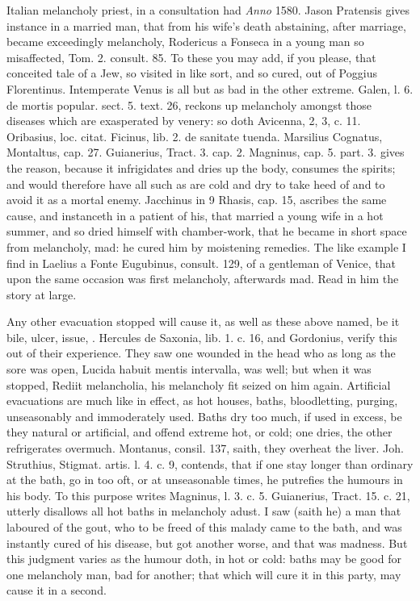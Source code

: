 {{Italian melancholy priest, in a consultation had \emph{Anno} 1580. Jason
Pratensis gives instance in a married man, that from his wife's death
abstaining, after marriage, became exceedingly melancholy,
Rodericus a Fonseca in a young man so misaffected, Tom. 2. consult. 85.
To these you may add, if you please, that conceited tale of a Jew, so
visited in like sort, and so cured, out of Poggius Florentinus.
Intemperate Venus is all but as bad in the other extreme. Galen, l. 6.
de mortis popular. sect. 5. text. 26, reckons up melancholy amongst
those diseases which are exasperated by venery: so doth Avicenna,
2, 3, c. 11. Oribasius, loc. citat. Ficinus, lib. 2. de sanitate
tuenda. Marsilius Cognatus, Montaltus, cap. 27. Guianerius, Tract. 3.
cap. 2. Magninus, cap. 5. part. 3. gives the reason, because
it infrigidates and dries up the body, consumes the spirits; and
would therefore have all such as are cold and dry to take heed of and
to avoid it as a mortal enemy. Jacchinus in 9 Rhasis, cap. 15, ascribes
the same cause, and instanceth in a patient of his, that married a
young wife in a hot summer, and so dried himself with
chamber-work, that he became in short space from melancholy, mad: he
cured him by moistening remedies. The like example I find in Laelius a
Fonte Eugubinus, consult. 129, of a gentleman of Venice, that upon the
same occasion was first melancholy, afterwards mad. Read in him the
story at large.

Any other evacuation stopped will cause it, as well as these above
named, be it bile, ulcer, issue, \etc{}. Hercules de Saxonia, lib. 1.
c. 16, and Gordonius, verify this out of their experience. They saw one
wounded in the head who as long as the sore was open, Lucida habuit
mentis intervalla, was well; but when it was stopped, Rediit
melancholia, his melancholy fit seized on him again.
Artificial evacuations are much like in effect, as hot houses, baths,
bloodletting, purging, unseasonably and immoderately used. Baths
dry too much, if used in excess, be they natural or artificial, and
offend extreme hot, or cold; one dries, the other refrigerates
overmuch. Montanus, consil. 137, saith, they overheat the liver. Joh.
Struthius, Stigmat. artis. l. 4. c. 9, contends, that if one stay
longer than ordinary at the bath, go in too oft, or at unseasonable
times, he putrefies the humours in his body. To this purpose writes
Magninus, l. 3. c. 5. Guianerius, Tract. 15. c. 21, utterly disallows
all hot baths in melancholy adust. I saw (saith he) a man that
laboured of the gout, who to be freed of this malady came to the bath,
and was instantly cured of his disease, but got another worse, and that
was madness. But this judgment varies as the humour doth, in hot or
cold: baths may be good for one melancholy man, bad for another; that
which will cure it in this party, may cause it in a second.

}}
